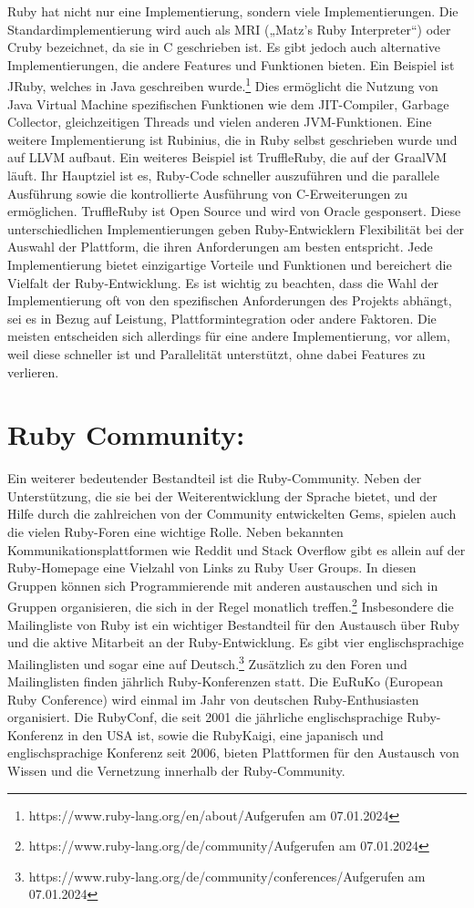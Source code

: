 \documentclass{article}
\begin{document}
Ruby hat nicht nur eine Implementierung, sondern viele Implementierungen.
Die Standardimplementierung wird auch als MRI („Matz's Ruby Interpreter“) oder Cruby bezeichnet, da sie in C geschrieben ist.
Es gibt jedoch auch alternative Implementierungen, die andere Features und Funktionen bieten.
Ein Beispiel ist JRuby, welches in Java geschreiben wurde.\footnote{https://www.ruby-lang.org/en/about/Aufgerufen am 07.01.2024}
Dies ermöglicht die Nutzung von Java Virtual Machine spezifischen Funktionen wie dem JIT-Compiler, Garbage Collector, gleichzeitigen Threads und vielen anderen JVM-Funktionen.
Eine weitere Implementierung ist Rubinius, die in Ruby selbst geschrieben wurde und auf LLVM aufbaut.
Ein weiteres Beispiel ist TruffleRuby, die auf der GraalVM läuft. Ihr Hauptziel ist es, Ruby-Code schneller auszuführen und die parallele Ausführung sowie die kontrollierte Ausführung von C-Erweiterungen zu ermöglichen. TruffleRuby ist Open Source und wird von Oracle gesponsert.
Diese unterschiedlichen Implementierungen geben Ruby-Entwicklern Flexibilität bei der Auswahl der Plattform, die ihren Anforderungen am besten entspricht.
Jede Implementierung bietet einzigartige Vorteile und Funktionen und bereichert die Vielfalt der Ruby-Entwicklung.
Es ist wichtig zu beachten, dass die Wahl der Implementierung oft von den spezifischen Anforderungen des Projekts abhängt, sei es in Bezug auf Leistung, Plattformintegration oder andere Faktoren.
Die meisten entscheiden sich allerdings für eine andere Implementierung, vor allem, weil diese schneller ist und Parallelität unterstützt, ohne dabei Features zu verlieren. 

\section*{Ruby Community:}
Ein weiterer bedeutender Bestandteil ist die Ruby-Community. Neben der Unterstützung, die sie bei der Weiterentwicklung der Sprache bietet, und der Hilfe durch die zahlreichen von der Community entwickelten Gems, spielen auch die vielen Ruby-Foren eine wichtige Rolle.
Neben bekannten Kommunikationsplattformen wie Reddit und Stack Overflow gibt es allein auf der Ruby-Homepage eine Vielzahl von Links zu Ruby User Groups. In diesen Gruppen können sich Programmierende mit anderen austauschen und sich in Gruppen organisieren, die sich in der Regel monatlich treffen.\footnote{https://www.ruby-lang.org/de/community/Aufgerufen am 07.01.2024}
Insbesondere die Mailingliste von Ruby ist ein wichtiger Bestandteil für den Austausch über Ruby und die aktive Mitarbeit an der Ruby-Entwicklung. Es gibt vier englischsprachige Mailinglisten und sogar eine auf Deutsch.\footnote{https://www.ruby-lang.org/de/community/conferences/Aufgerufen am 07.01.2024}
Zusätzlich zu den Foren und Mailinglisten finden jährlich Ruby-Konferenzen statt. Die EuRuKo (European Ruby Conference) wird einmal im Jahr von deutschen Ruby-Enthusiasten organisiert. Die RubyConf, die seit 2001 die jährliche englischsprachige Ruby-Konferenz in den USA ist, sowie die RubyKaigi, eine japanisch und englischsprachige Konferenz seit 2006, bieten Plattformen für den Austausch von Wissen und die Vernetzung innerhalb der Ruby-Community.
\end{document}
